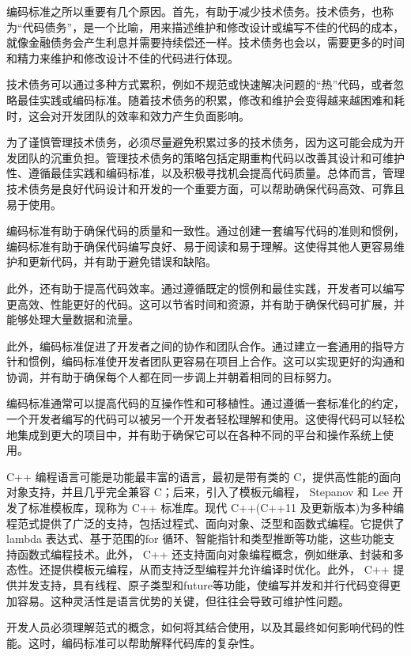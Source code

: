 
编码标准之所以重要有几个原因。首先，有助于减少技术债务。技术债务，也称为“代码债务”，是一个比喻，用来描述维护和修改设计或编写不佳的代码的成本，就像金融债务会产生利息并需要持续偿还一样。技术债务也会以，需要更多的时间和精力来维护和修改设计不佳的代码进行体现。

技术债务可以通过多种方式累积，例如不规范或快速解决问题的“热”代码，或者忽略最佳实践或编码标准。随着技术债务的积累，修改和维护会变得越来越困难和耗时，这会对开发团队的效率和效力产生负面影响。

为了谨慎管理技术债务，必须尽量避免积累过多的技术债务，因为这可能会成为开发团队的沉重负担。管理技术债务的策略包括定期重构代码以改善其设计和可维护性、遵循最佳实践和编码标准，以及积极寻找机会提高代码质量。总体而言，管理技术债务是良好代码设计和开发的一个重要方面，可以帮助确保代码高效、可靠且易于使用。

编码标准有助于确保代码的质量和一致性。通过创建一套编写代码的准则和惯例，编码标准有助于确保代码编写良好、易于阅读和易于理解。这使得其他人更容易维护和更新代码，并有助于避免错误和缺陷。

此外，还有助于提高代码效率。通过遵循既定的惯例和最佳实践，开发者可以编写更高效、性能更好的代码。这可以节省时间和资源，并有助于确保代码可扩展，并能够处理大量数据和流量。

此外，编码标准促进了开发者之间的协作和团队合作。通过建立一套通用的指导方针和惯例，编码标准使开发者团队更容易在项目上合作。这可以实现更好的沟通和协调，并有助于确保每个人都在同一步调上并朝着相同的目标努力。

编码标准通常可以提高代码的互操作性和可移植性。通过遵循一套标准化的约定，一个开发者编写的代码可以被另一个开发者轻松理解和使用。这使得代码可以轻松地集成到更大的项目中，并有助于确保它可以在各种不同的平台和操作系统上使用。

C++ 编程语言可能是功能最丰富的语言，最初是带有类的 C，提供高性能的面向对象支持，并且几乎完全兼容 C；后来，引入了模板元编程， Stepanov 和 Lee 开发了标准模板库，现称为 C++ 标准库。现代 C++(C++11 及更新版本)为多种编程范式提供了广泛的支持，包括过程式、面向对象、泛型和函数式编程。它提供了 lambda 表达式、基于范围的for 循环、智能指针和类型推断等功能，这些功能支持函数式编程技术。此外， C++ 还支持面向对象编程概念，例如继承、封装和多态性。还提供模板元编程，从而支持泛型编程并允许编译时优化。此外， C++ 提供并发支持，具有线程、原子类型和future等功能，使编写并发和并行代码变得更加容易。这种灵活性是语言优势的关键，但往往会导致可维护性问题。

开发人员必须理解范式的概念，如何将其结合使用，以及其最终如何影响代码的性能。这时，编码标准可以帮助解释代码库的复杂性。

